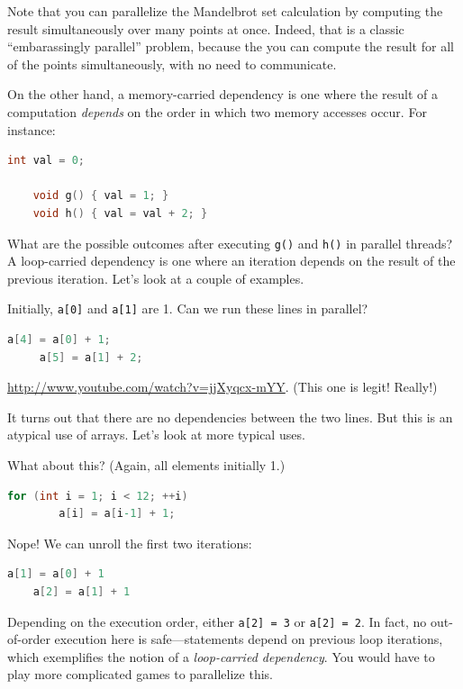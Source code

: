 \documentclass[a4paper]{report}
\begin{document}
Note that you can parallelize the Mandelbrot set calculation
by computing the result simultaneously over many points at
once. Indeed, that is a classic ``embarassingly parallel'' problem,
because the you can compute the result for all of the points
simultaneously, with no need to communicate.

On the other hand, a memory-carried dependency is one where the result
of a computation \emph{depends} on the order in which two memory accesses
occur. For instance:

{\small \begin{lstlisting}[language=C]
    int val = 0;

    void g() { val = 1; }
    void h() { val = val + 2; }
\end{lstlisting} }

{\sf What are the possible outcomes after executing {\tt g()} and {\tt h()}
in parallel threads?} \\[1em]

A loop-carried dependency is one where an
iteration depends on the result of the previous iteration. Let's look
at a couple of examples.


Initially, {\tt a[0]} and {\tt a[1]} are 1.
Can we run these lines in parallel?

\begin{lstlisting}[language=C]
     a[4] = a[0] + 1;
     a[5] = a[1] + 2;
\end{lstlisting}

\url{http://www.youtube.com/watch?v=jjXyqcx-mYY}. (This one is legit! Really!)

It turns out that there are no dependencies between the two lines. But this is
an atypical use of arrays. Let's look at more typical uses.


What about this? (Again, all elements initially 1.)

\begin{lstlisting}[language=C]
    for (int i = 1; i < 12; ++i)
        a[i] = a[i-1] + 1;
\end{lstlisting}

Nope! We can unroll the first two iterations:
\begin{lstlisting}[language=C]
    a[1] = a[0] + 1
    a[2] = a[1] + 1
\end{lstlisting}

Depending on the execution order, either {\tt a[2] = 3} or {\tt a[2] =
  2}.  In fact, no out-of-order execution here is safe---statements depend
on previous loop iterations, which exemplifies the notion of a
\emph{loop-carried dependency}. You would have
to play more complicated games to parallelize this.
\end{document}
